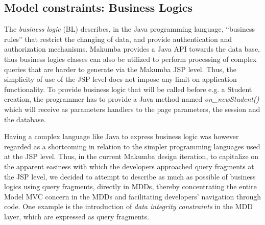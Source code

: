 \documentclass{chi2009}
\begin{document}
\subsection{Model constraints: Business Logics}
The \textit{business logic} (BL) describes, in the Java programming language, ``business rules'' that restrict the changing of data, and provide authentication and authorization mechanisms. Makumba provides a Java API towards the data base, thus business logics classes can also be utilized to perform processing of complex queries that are harder to generate via the Makumba JSP level. Thus, the simplicity of use of the JSP level does not impose any limit on application functionality. To provide business logic that will be called before e.g. a Student creation, the programmer has to provide a Java method named \textit{on\_newStudent()} which will receive as parameters handlers to the page parameters, the session and the database.




Having a complex language like Java to express business logic was however regarded as a shortcoming in relation to the simpler programming languages used at the JSP level. Thus, in the current Makumba design iteration, to capitalize on the apparent easiness with which the developers approached query fragments at the JSP level, we decided to attempt to describe as much as possible of business logics using query fragments, directly in MDDs, thereby concentrating the entire Model MVC concern in the MDDs and facilitating developers' navigation through code. One example is the introduction of \textit{data integrity constraints} in the MDD layer, which are expressed as query fragments. 
\end{document}
